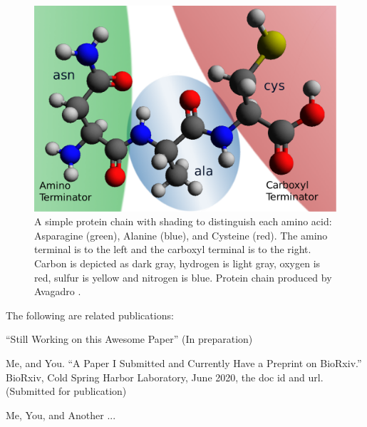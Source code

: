 \begin{figure}[h!]
\centering
\includegraphics[width=0.7\linewidth]{images/ASN-ALA-CYS}
\caption{A simple protein chain with shading to distinguish each amino acid: Asparagine (green), Alanine (blue), and Cysteine (red). The amino terminal is to the left and the carboxyl terminal is to the right. Carbon is depicted as dark gray, hydrogen is light gray, oxygen is red, sulfur is yellow and nitrogen is blue. Protein chain produced by Avagadro \citep{Hanwell2012}.}
\label{fig:ASN-ALA-CYS}
\end{figure}


\noindent The following are related publications:

\begin{list}{}{}
	\item “Still Working on this Awesome Paper” (In preparation)

	\item Me, and You. “A Paper I Submitted and Currently Have a Preprint on BioRxiv.” BioRxiv, Cold Spring Harbor Laboratory, June 2020, the doc id and url. (Submitted for publication)

	\item Me, You, and Another ...

\end{list}


